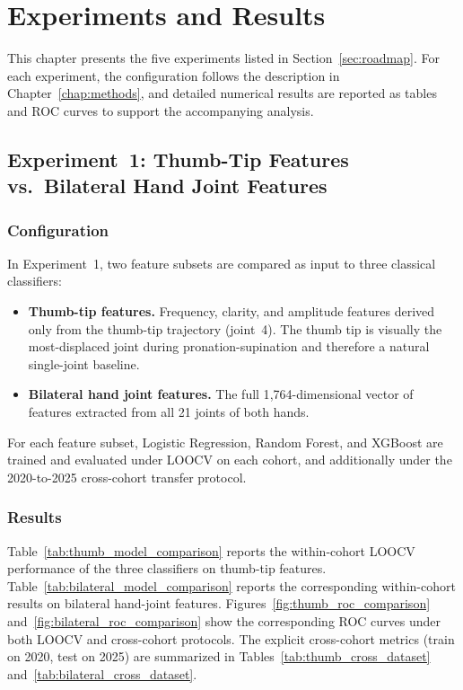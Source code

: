 
\chapter{Experiments and Results}
\label{chap:results}


This chapter presents the five experiments listed in Section~\ref{sec:roadmap}. For each experiment, the configuration follows the description in Chapter~\ref{chap:methods}, and detailed numerical results are reported as tables and ROC curves to support the accompanying analysis.

\section{Experiment~1: Thumb-Tip Features vs.\ Bilateral Hand Joint Features}
\label{sec:exp1}

\subsection{Configuration}

In Experiment~1, two feature subsets are compared as input to three classical classifiers:
\begin{itemize}
    \item \textbf{Thumb-tip features.} Frequency, clarity, and amplitude features derived only from the thumb-tip trajectory (joint~4). The thumb tip is visually the most-displaced joint during pronation-supination and therefore a natural single-joint baseline.
    \item \textbf{Bilateral hand joint features.} The full 1{,}764-dimensional vector of features extracted from all 21 joints of both hands.
\end{itemize}

For each feature subset, Logistic Regression, Random Forest, and XGBoost are trained and evaluated under LOOCV on each cohort, and additionally under the 2020-to-2025 cross-cohort transfer protocol.

\subsection{Results}

Table~\ref{tab:thumb_model_comparison} reports the within-cohort LOOCV performance of the three classifiers on thumb-tip features. Table~\ref{tab:bilateral_model_comparison} reports the corresponding within-cohort results on bilateral hand-joint features. Figures~\ref{fig:thumb_roc_comparison} and~\ref{fig:bilateral_roc_comparison} show the corresponding ROC curves under both LOOCV and cross-cohort protocols. The explicit cross-cohort metrics (train on 2020, test on 2025) are summarized in Tables~\ref{tab:thumb_cross_dataset} and~\ref{tab:bilateral_cross_dataset}.

